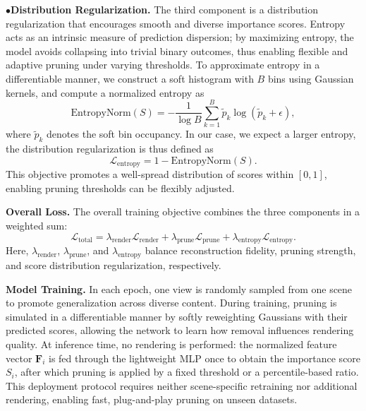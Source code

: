 $\bullet$\textbf{Distribution Regularization.} The third component is a distribution regularization that encourages smooth and diverse importance scores. 
Entropy acts as an intrinsic measure of prediction dispersion; by maximizing entropy, the model avoids collapsing into trivial binary outcomes, thus enabling flexible and adaptive pruning under varying thresholds.
To approximate entropy in a differentiable manner, we construct a soft histogram with $B$ bins using Gaussian kernels, and compute a normalized entropy as
\begin{equation}
\mathrm{EntropyNorm}(S) = 
-\frac{1}{\log B} 
\sum_{k=1}^{B} \tilde{p}_k \log(\tilde{p}_k + \epsilon),
\end{equation}
where $\tilde{p}_k$ denotes the soft bin occupancy. In our case, we expect a larger entropy, the distribution regularization is thus defined as
\begin{equation}
\mathcal{L}_{\text{entropy}} = 1 - \mathrm{EntropyNorm}(S).
\end{equation}
This objective promotes a well-spread distribution of scores within $[0,1]$, enabling pruning thresholds can be flexibly adjusted.

\textbf{Overall Loss.} The overall training objective combines the three components in a weighted sum:
\begin{equation}
\label{eq:loss_total}
\mathcal{L}_{\text{total}} =
\lambda_{\text{render}} \mathcal{L}_{\text{render}} +
\lambda_{\text{prune}} \mathcal{L}_{\text{prune}} +
\lambda_{\text{entropy}} \mathcal{L}_{\text{entropy}}.
\end{equation}
Here, $\lambda_{\text{render}}$, $\lambda_{\text{prune}}$, and $\lambda_{\text{entropy}}$ balance reconstruction fidelity, pruning strength, and score distribution regularization, respectively.

\textbf{Model Training.} 
In each epoch, one view is randomly sampled from one scene to promote generalization across diverse content. 
During training, pruning is simulated in a differentiable manner by softly reweighting Gaussians with their predicted scores, allowing the network to learn how removal influences rendering quality. 
At inference time, no rendering is performed: the normalized feature vector $\mathbf{F}_i$ is fed through the lightweight MLP once to obtain the importance score $S_i$, after which pruning is applied by a fixed threshold or a percentile-based ratio. 
This deployment protocol requires neither scene-specific retraining nor additional rendering, enabling fast, plug-and-play pruning on unseen datasets.
